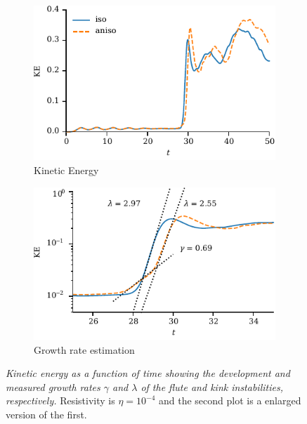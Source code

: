 \documentclass[fleqn,usenatbib]{mnras}
\newcommand{\rs}[2]{{#2}}
\newcommand{\mycaption}[2]{\caption[#1]{\emph{#1} #2}}
\begin{document}
\begin{figure}
  \centering
    \begin{subfigure}{0.49\textwidth}
      \includegraphics[width=\linewidth]{kinetic_energy-4.pdf}
      \caption{Kinetic Energy}
      \label{fig:kink_ke-4}
    \end{subfigure}
    \hfill
    \begin{subfigure}{0.49\textwidth}
      \includegraphics[width=\linewidth]{kinetic_energy_log-4.pdf}
      \caption{Growth rate estimation}
      \label{fig:kink_ke_log-4}
    \end{subfigure}
  \mycaption{Kinetic energy as a function of time showing the
    development and measured growth rates \rs{}{$\gamma$ and $\lambda$}
    of the \rs{fluting}{flute}
    and kink instabilities, \rs{}{respectively.}}{\rs{Both plots are from results
      where}{Resistivity is $\eta=10^{-4}$ and the second plot is a
      enlarged version of the first.}}
\label{fig:kink_str8_ke-4}%
\end{figure}
\end{document}
